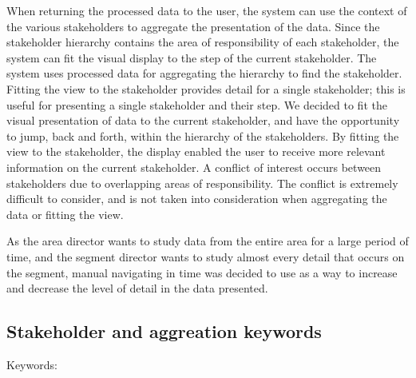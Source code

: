 When returning the processed data to the user, the system can use the 
context of the various stakeholders to aggregate the presentation of the data. Since the stakeholder hierarchy contains the area of responsibility of each stakeholder, the system can fit the visual display to the step of the current stakeholder. The system uses processed data for aggregating the hierarchy to find the stakeholder. Fitting the view to the stakeholder provides detail for a single stakeholder; this is useful for presenting a single stakeholder and their step.
We decided to fit the visual presentation of data 
to the current stakeholder, and have the opportunity to jump, back and forth, 
within the hierarchy of the stakeholders. By fitting the view to the 
stakeholder, the display enabled the user to receive more relevant information 
on the current stakeholder. A conflict of interest occurs between stakeholders 
due to overlapping areas of responsibility. The conflict is extremely difficult 
to consider, and is not taken into consideration when aggregating the data or 
fitting the view.

As the area director wants to study data from the entire area for a large 
period of time, and the segment director wants to study almost every detail 
that occurs on the segment, manual navigating in time was decided to use as a 
way to increase and decrease the level of detail in the data presented.

\subsection{Stakeholder and aggreation keywords} %
\label{sub:stakeholder_and_aggreation_keywords}
Keywords:

